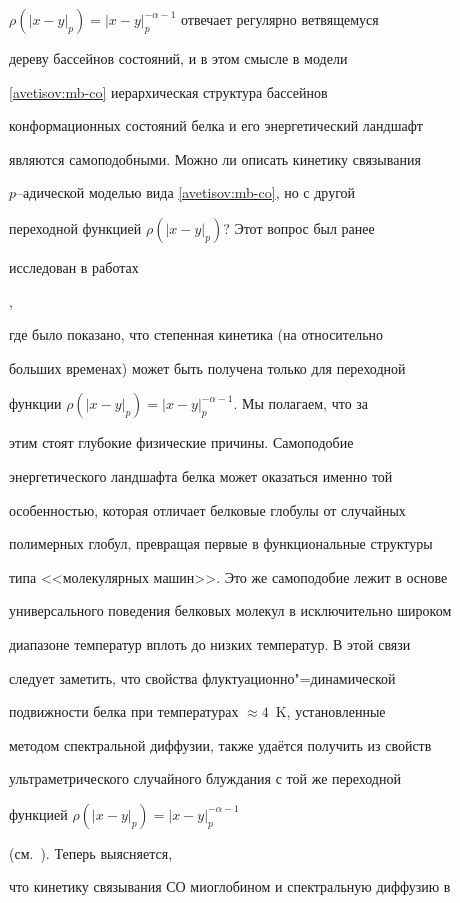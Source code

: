 $\rho(|x-y|_p)=|x-y|_p^{-\alpha-1}$ отвечает регулярно ветвящемуся

дереву бассейнов состояний, и в этом смысле в модели

\eqref{avetisov:mb-co} иерархическая структура бассейнов

конформационных состояний белка и его энергетический ландшафт

являются самоподобными. Можно ли описать кинетику связывания

$p$--адической моделью вида \eqref{avetisov:mb-co}, но с другой

переходной функцией $\rho(|x-y|_p)$? Этот вопрос был ранее

исследован в работах

\cite{avetisov_bikulov_zubarev:bib:ABKO,avetisov_bikulov_zubarev:bib:ABO},

где было показано, что степенная кинетика  (на относительно

больших временах) может быть получена только для переходной

функции $\rho(|x-y|_p)=|x-y|_p^{-\alpha-1}$. Мы полагаем, что за

этим стоят глубокие физические причины. Самоподобие

энергетического ландшафта белка может оказаться именно той

особенностью, которая отличает белковые глобулы от случайных

полимерных глобул, превращая первые в функциональные структуры

типа <<молекулярных машин>>. Это же самоподобие лежит в основе

универсального поведения белковых молекул в исключительно широком

диапазоне температур вплоть до низких температур. В этой связи

следует заметить, что свойства флуктуационно"=динамической

подвижности белка при температурах $\approx 4$~K, установленные

методом спектральной диффузии, также удаётся получить из свойств

ультраметрического случайного блуждания с той же переходной

функцией $\rho(|x-y|_p)=|x-y|_p^{-\alpha-1}$

(см.~\cite{avetisov_bikulov_zubarev:bib:AB}). Теперь выясняется,

что кинетику связывания СО миоглобином и спектральную диффузию в

